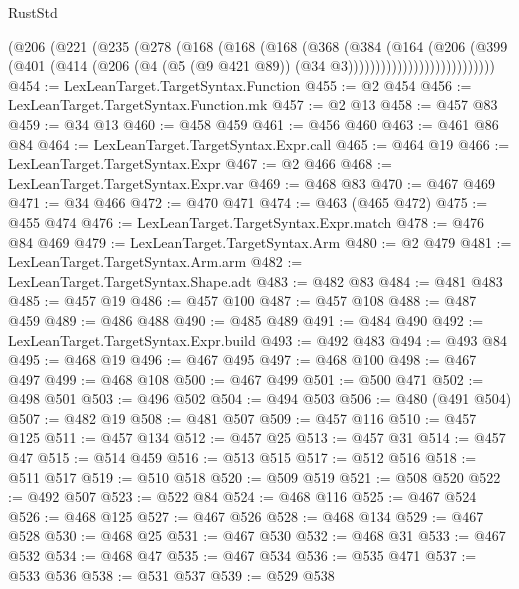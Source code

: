 \begin{lexlean}{RustStd}
\begin{coremodule}
                        (@206
                          (@221
                            (@235
                              (@278
                                (@168
                                  (@168
                                    (@168
                                      (@368
                                        (@384
                                          (@164
                                            (@206
                                              (@399
                                                (@401
                                                  (@414
                                                    (@206
                                                      (@4
                                                        (@5 (@9 @421 @89))
                                                        (@34 @3)))))))))))))))))))))))))))
@454 := LexLeanTarget.TargetSyntax.Function
@455 := @2 @454
@456 := LexLeanTarget.TargetSyntax.Function.mk
@457 := @2 @13
@458 := @457 @83
@459 := @34 @13
@460 := @458 @459
@461 := @456 @460
@463 := @461 @86 @84
@464 := LexLeanTarget.TargetSyntax.Expr.call
@465 := @464 @19
@466 := LexLeanTarget.TargetSyntax.Expr
@467 := @2 @466
@468 := LexLeanTarget.TargetSyntax.Expr.var
@469 := @468 @83
@470 := @467 @469
@471 := @34 @466
@472 := @470 @471
@474 := @463 (@465 @472)
@475 := @455 @474
@476 := LexLeanTarget.TargetSyntax.Expr.match
@478 := @476 @84 @469
@479 := LexLeanTarget.TargetSyntax.Arm
@480 := @2 @479
@481 := LexLeanTarget.TargetSyntax.Arm.arm
@482 := LexLeanTarget.TargetSyntax.Shape.adt
@483 := @482 @83
@484 := @481 @483
@485 := @457 @19
@486 := @457 @100
@487 := @457 @108
@488 := @487 @459
@489 := @486 @488
@490 := @485 @489
@491 := @484 @490
@492 := LexLeanTarget.TargetSyntax.Expr.build
@493 := @492 @483
@494 := @493 @84
@495 := @468 @19
@496 := @467 @495
@497 := @468 @100
@498 := @467 @497
@499 := @468 @108
@500 := @467 @499
@501 := @500 @471
@502 := @498 @501
@503 := @496 @502
@504 := @494 @503
@506 := @480 (@491 @504)
@507 := @482 @19
@508 := @481 @507
@509 := @457 @116
@510 := @457 @125
@511 := @457 @134
@512 := @457 @25
@513 := @457 @31
@514 := @457 @47
@515 := @514 @459
@516 := @513 @515
@517 := @512 @516
@518 := @511 @517
@519 := @510 @518
@520 := @509 @519
@521 := @508 @520
@522 := @492 @507
@523 := @522 @84
@524 := @468 @116
@525 := @467 @524
@526 := @468 @125
@527 := @467 @526
@528 := @468 @134
@529 := @467 @528
@530 := @468 @25
@531 := @467 @530
@532 := @468 @31
@533 := @467 @532
@534 := @468 @47
@535 := @467 @534
@536 := @535 @471
@537 := @533 @536
@538 := @531 @537
@539 := @529 @538

\end{coremodule}
\end{lexlean}
